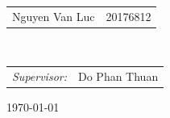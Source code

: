 \begin{titlepage}
\begin{center}
\begin{tabular}{ c   |   c } 
 Nguyen Van Luc & 20176812%
\end{tabular} 
\\[1cm]
\begin{tabular}{cc}
 \textit{Supervisor:} &  Do Phan Thuan %
\end{tabular}
\end{center}

\vspace{1cm}

\vfill

{\large \today}\\[1cm]
\vfill 

\end{titlepage}
